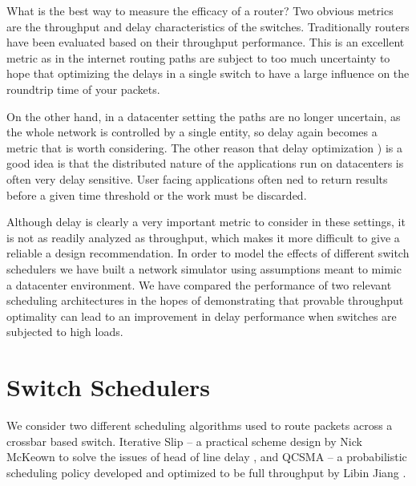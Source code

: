 \documentclass{IEEEtran}%
\begin{document}
What is the best way to measure the efficacy of a router?  Two obvious metrics are the throughput and delay characteristics of the switches.  Traditionally routers have been evaluated based on their throughput performance.  This is an excellent metric as in the internet routing paths are subject to too much uncertainty to hope that optimizing the delays in a single switch to have a large influence on the roundtrip time of your packets.

On the other hand, in a datacenter setting the paths are no longer uncertain, as the whole network is controlled by a single entity, so delay again becomes a metric that is worth considering.  The other reason that delay optimization ) is a good idea is that the distributed nature of the applications run on datacenters is often very delay sensitive.  User facing applications often ned to return results before a given time threshold or the work must be discarded.%

Although delay is clearly a very important metric to consider in these settings, it is not as readily analyzed as throughput, which makes it more difficult to give a reliable a design recommendation.  In order to model the effects of different switch schedulers we have built a network simulator using assumptions meant to mimic a datacenter environment.  We have compared the performance of two relevant scheduling architectures in the hopes of demonstrating that provable throughput optimality can lead to an improvement in delay performance when switches are subjected to high loads.

\section{Switch Schedulers}
We consider two different scheduling algorithms used to route packets across a crossbar based switch.  Iterative Slip -- a practical scheme design by Nick McKeown to solve the issues of head of line delay \cite{McKeown}, and QCSMA -- a probabilistic scheduling policy developed and optimized to be full throughput by Libin Jiang \cite{Libin}.
\end{document}
